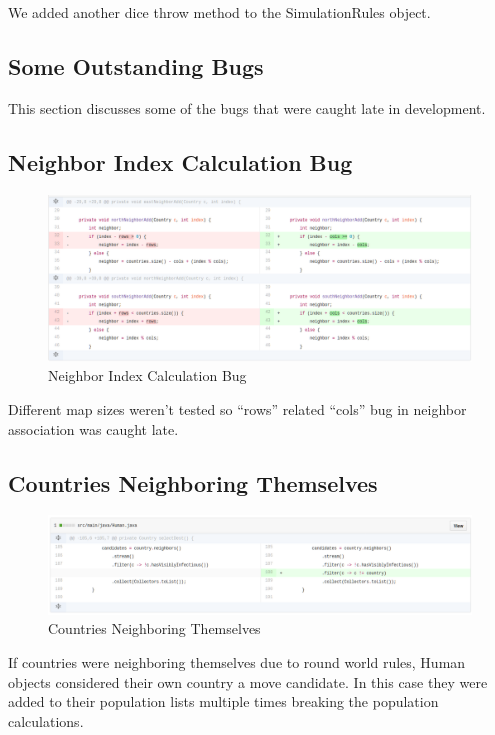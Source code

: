 \documentclass[]{article}
\begin{document}
We added another dice throw method to the SimulationRules object.

\subsection{Some Outstanding Bugs}\label{some-outstanding-bugs}

This section discusses some of the bugs that were caught late in
development.

\subsection{Neighbor Index Calculation
Bug}\label{neighbor-index-calculation-bug}

\begin{figure}[H]
\centering
\includegraphics{./doc/index.png}
\caption{Neighbor Index Calculation Bug}
\end{figure}

Different map sizes weren't tested so ``rows'' related ``cols'' bug in
neighbor association was caught late.

\subsection{Countries Neighboring
Themselves}\label{countries-neighboring-themselves}

\begin{figure}[H]
\centering
\includegraphics{doc/move.png}
\caption{Countries Neighboring Themselves}
\end{figure}

If countries were neighboring themselves due to round world rules, Human
objects considered their own country a move candidate. In this case they
were added to their population lists multiple times breaking the
population calculations.
\end{document}
